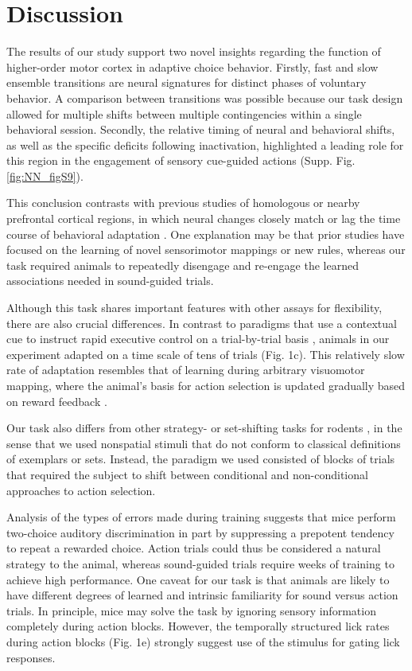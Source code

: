 \section{Discussion}

The results of our study support two novel insights regarding the function of higher-order motor cortex in adaptive choice behavior. Firstly, fast and slow ensemble transitions are neural signatures for distinct phases of voluntary behavior. A comparison between transitions was possible because our task design allowed for multiple shifts between multiple contingencies within a single behavioral session. Secondly, the relative timing of neural and behavioral shifts, as well as the specific deficits following inactivation, highlighted a leading role for this region in the engagement of sensory cue-guided actions (Supp. Fig. \ref{fig:NN_figS9}). 

This conclusion contrasts with previous studies of homologous or nearby prefrontal cortical regions, in which neural changes closely match or lag the time course of behavioral adaptation \citep{mitz1991learning,pasupathy2005different,durstewitz2010abrupt}. One explanation may be that prior studies have focused on the learning of novel sensorimotor mappings or new rules, whereas our task required animals to repeatedly disengage and re-engage the learned associations needed in sound-guided trials. 

Although this task shares important features with other assays for flexibility, there are also crucial differences. In contrast to paradigms that use a contextual cue to instruct rapid executive control on a trial-by-trial basis \citep{mante2013context,stokes2013dynamic,duan2015requirement}, animals in our experiment adapted on a time scale of tens of trials (Fig. 1c). This relatively slow rate of adaptation resembles that of learning during arbitrary visuomotor mapping, where the animal's basis for action selection is updated gradually based on reward feedback \citep{pasupathy2005different,asaad1998neural}. 

Our task also differs from other strategy- or set-shifting tasks for rodents \citep{durstewitz2010abrupt,darrah2008interaction}, in the sense that we used nonspatial stimuli that do not conform to classical definitions of exemplars or sets. Instead, the paradigm we used consisted of blocks of trials that required the subject to shift between conditional and non-conditional approaches to action selection. 

Analysis of the types of errors made during training suggests that mice perform two-choice auditory discrimination in part by suppressing a prepotent tendency to repeat a rewarded choice. Action trials could thus be considered a natural strategy to the animal, whereas sound-guided trials require weeks of training to achieve high performance. One caveat for our task is that animals are likely to have different degrees of learned and intrinsic familiarity for sound versus action trials. In principle, mice may solve the task by ignoring sensory information completely during action blocks. However, the temporally structured lick rates during action blocks (Fig. 1e) strongly suggest use of the stimulus for gating lick responses. 

